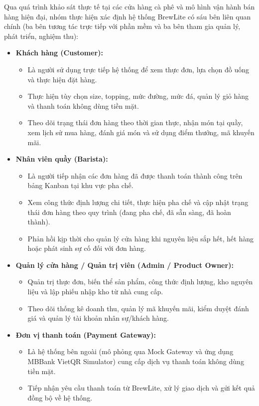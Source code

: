\documentclass[12pt,a4paper]{report}
\begin{document}
Qua quá trình khảo sát thực tế tại các cửa hàng cà phê và mô hình vận hành bán hàng hiện đại, nhóm thực hiện xác định hệ thống BrewLite có sáu bên liên quan chính (ba bên tương tác trực tiếp với phần mềm và ba bên tham gia quản lý, phát triển, nghiệm thu):

\begin{itemize}[leftmargin=*]
\item \textbf{Khách hàng (Customer):}
  \begin{itemize}[nosep]
  \item Là người sử dụng trực tiếp hệ thống để xem thực đơn, lựa chọn đồ uống và thực hiện đặt hàng.
  \item Thực hiện tùy chọn size, topping, mức đường, mức đá, quản lý giỏ hàng và thanh toán không dùng tiền mặt.
  \item Theo dõi trạng thái đơn hàng theo thời gian thực, nhận món tại quầy, xem lịch sử mua hàng, đánh giá món và sử dụng điểm thưởng, mã khuyến mãi.
  \end{itemize}

\item \textbf{Nhân viên quầy (Barista):}
  \begin{itemize}[nosep]
  \item Là người tiếp nhận các đơn hàng đã được thanh toán thành công trên bảng Kanban tại khu vực pha chế.
  \item Xem công thức định lượng chi tiết, thực hiện pha chế và cập nhật trạng thái đơn hàng theo quy trình (đang pha chế, đã sẵn sàng, đã hoàn thành).
  \item Phản hồi kịp thời cho quản lý cửa hàng khi nguyên liệu sắp hết, hết hàng hoặc phát sinh sự cố đối với đơn hàng.
  \end{itemize}

\item \textbf{Quản lý cửa hàng / Quản trị viên (Admin / Product Owner):}
  \begin{itemize}[nosep]
  \item Quản trị thực đơn, biến thể sản phẩm, công thức định lượng, kho nguyên liệu và lập phiếu nhập kho từ nhà cung cấp.
  \item Theo dõi thống kê doanh thu, quản lý mã khuyến mãi, kiểm duyệt đánh giá và quản lý tài khoản nhân sự/khách hàng.
  \end{itemize}

\item \textbf{Đơn vị thanh toán (Payment Gateway):}
  \begin{itemize}[nosep]
  \item Là hệ thống bên ngoài (mô phỏng qua Mock Gateway và ứng dụng MBBank VietQR Simulator) cung cấp dịch vụ thanh toán không dùng tiền mặt.
  \item Tiếp nhận yêu cầu thanh toán từ BrewLite, xử lý giao dịch và gửi kết quả đồng bộ về hệ thống.
  \end{itemize}


\end{itemize}
\end{document}
